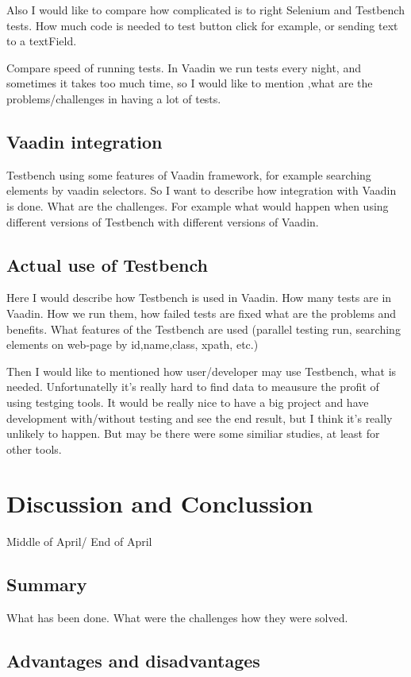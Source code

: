 \documentclass{article}
\begin{document}
    Also I would like to compare how complicated is to right Selenium and
    Testbench tests. How much code is needed to test button click for example,
    or sending text to a textField.
    
    Compare speed of running tests. In Vaadin we run tests every night, and
    sometimes it takes too much time, so I would like to mention ,what are the
    problems/challenges in having a lot of tests.
    
   \subsection {Vaadin integration}
    Testbench using some features of Vaadin framework, for example searching
    elements by vaadin selectors. So I want to describe how integration with
    Vaadin is done. What are the challenges. For example what would happen when
    using different versions of Testbench with different versions of Vaadin.
    
   \subsection{Actual use of Testbench}
    Here I would describe how Testbench is used in Vaadin. How many tests are in
    Vaadin. How we run them, how failed tests are fixed what are the problems
    and benefits. What features of the Testbench are used (parallel testing
    run, searching elements on web-page by id,name,class, xpath, etc.)
    
    Then I would like to mentioned how user/developer may use Testbench, what is
    needed. Unfortunatelly it's really hard to find data to meausure the profit
    of using testging tools. It would be really nice to have a big project and
    have development with/without testing and see the end result, but I think
    it's really unlikely to happen. But may be there were some similiar studies,
    at least for other tools.
 \section {Discussion and Conclussion}
 	Middle of April/ End of April
 	\subsection {Summary}
 	  What has been done. What were the challenges how they were solved.
 	\subsection {Advantages and disadvantages}
\end{document}
